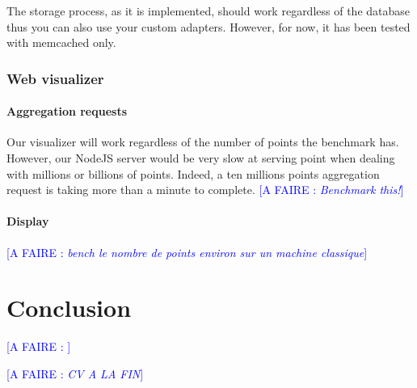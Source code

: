 \documentclass[a4paper,11pt]{report}
\newcommand*{\todo}[1]{\textcolor{blue}{[A FAIRE : \emph{#1}]}}
\begin{document}
The storage process, as it is implemented, should work regardless of the database thus you can also use your custom adapters.
However, for now, it has been tested with memcached only.

\subsection{Web visualizer}

\subsubsection{Aggregation requests}

Our visualizer will work regardless of the number of points the benchmark has. However, our NodeJS server would be very slow at serving point when dealing with millions or billions of points. Indeed, a ten millions points aggregation request is taking more than a minute to complete. \todo{Benchmark this!}

\subsubsection{Display}

\todo{bench le nombre de points environ sur un machine classique}

\clearpage

\chapter*{Conclusion}

\todo{}

\todo{CV A LA FIN}
\clearpage




\newpage

\end{document}
